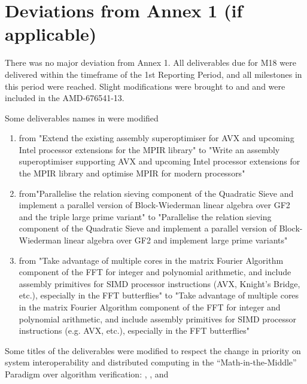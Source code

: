 \documentclass{deliverablereport}
\begin{document}
  \section{Deviations from Annex 1 (if applicable)}

There was no major deviation from Annex 1. All deliverables due for M18 were delivered
  within the timeframe of the 1st Reporting Period, and all milestones in this period were
  reached.  Slight modifications were brought to  and  and were
  included in the AMD-676541-13.


  Some deliverables names in  were modified
  \begin{enumerate}
  \item {} from "Extend the existing assembly
    superoptimiser for AVX and upcoming Intel processor extensions for the MPIR library"
    to "Write an assembly superoptimiser supporting AVX and upcoming Intel processor
    extensions for the MPIR library and optimise MPIR for modern processors"
  \item {} from"Parallelise the relation sieving component of the
    Quadratic Sieve and implement a parallel version of Block-Wiederman linear algebra
    over GF2 and the triple large prime variant" to "Parallelise the relation sieving
    component of the Quadratic Sieve and implement a parallel version of Block-Wiederman
    linear algebra over GF2 and implement large prime variants"
  \item {} from "Take advantage of multiple cores in the matrix Fourier
    Algorithm component of the FFT for integer and polynomial arithmetic, and include
    assembly primitives for SIMD processor instructions (AVX, Knight's Bridge, etc.),
    especially in the FFT butterflies" to "Take advantage of multiple cores in the matrix
    Fourier Algorithm component of the FFT for integer and polynomial arithmetic, and
    include assembly primitives for SIMD processor instructions (e.g. AVX, etc.),
    especially in the FFT butterflies"
  \end{enumerate}

  Some titles of the  deliverables were modified to respect the change in
  priority on system interoperability and distributed computing in the
  ``Math-in-the-Middle'' Paradigm over algorithm verification:
  , , and
\end{document}
